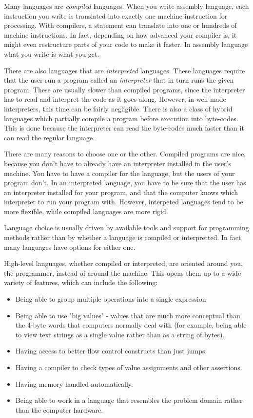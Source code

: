 Many languages are \emph{compiled} languages.  
When you write assembly language, each instruction you write is 
translated into
exactly one machine instruction for processing.  With compilers,
a statement can translate into one or hundreds of machine 
instructions.  In fact, depending on how advanced your compiler
is, it might even restructure parts of your code to make it faster.
In assembly language what you write is what you get.

There are also languages that are \emph{interpreted}
languages.  These languages require that the user run a program
called an \emph{interpreter} that in turn runs the
given program.  These are usually slower than compiled programs,
since the interpreter has to read and interpret the code as it goes 
along.  However, in well-made interpreters, this time can be
fairly negligible.  There is also a class of hybrid languages
which partially compile a program before execution into byte-codes.
This is done because the interpreter
can read the byte-codes much faster than it can read the regular language.

There are many reasons to choose one or the other.  Compiled programs
are nice, because you don't have to already have an interpreter installed
in the user's machine.  You have to have a compiler for the language,
but the users of your program don't.  In an interpreted language, you
have to be sure that the user has an interpreter installed for your program,
and that the computer knows which interpreter to run your program with.  However,
interpeted languages tend to be more flexible, while compiled languages
are more rigid.

Language choice is usually driven by available tools and support for 
programming methods rather than by whether a language is compiled
or interpretted.  In fact many languages have options for either one.  

High-level languages, whether compiled or interpreted, are oriented around
you, the programmer, instead of around the machine.  This opens them up
to a wide variety of features, which can include the following:

\begin{itemize}\item Being able to group multiple operations into a single expression 
\item Being able to use "big values" - values that are much more conceptual than the 4-byte words that computers normally deal with (for example, being able to view text strings as a single value rather than as a string of bytes). 
\item Having access to better flow control constructs than just jumps. 
\item Having a compiler to check types of value assignments and other assertions. 
\item Having memory handled automatically. 
\item Being able to work in a language that resembles the problem domain rather than the computer hardware. 
\end{itemize}

